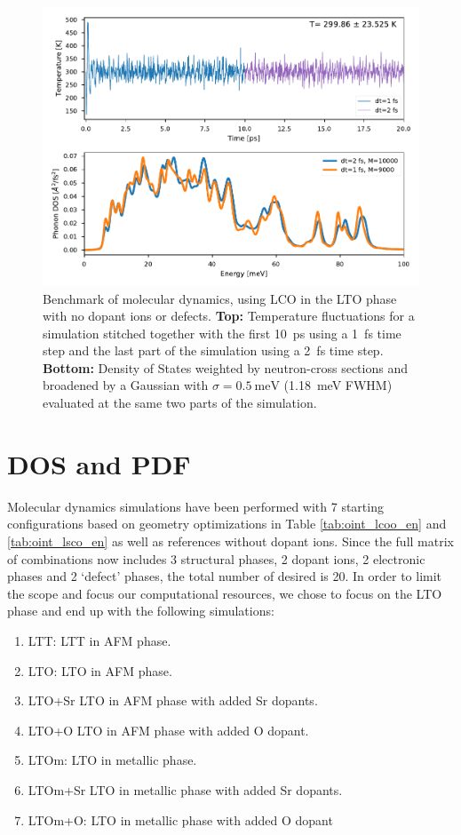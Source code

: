 \begin{figure}
	\centering
	\includegraphics[width=\textwidth]{fig/md/stitch.pdf}
	\caption[stitched md runs]{Benchmark of molecular dynamics, using LCO in the LTO phase with no dopant ions or defects. \textbf{Top:} Temperature fluctuations for a simulation stitched together with the first \SI{10}{\pico\second} using a \SI{1}{\femto\second} time step and the last part of the simulation using a \SI{2}{\femto\second} time step. \textbf{Bottom:} Density of States weighted by neutron-cross sections and broadened by a Gaussian with $\sigma=\SI{0.5}{\milli\eV}$ (\SI{1.18}{\milli\eV} FWHM) evaluated at the same two parts of the simulation.}
	\label{fig:stitch}
\end{figure}

\section{DOS and PDF}
Molecular dynamics simulations have been performed with 7 starting configurations based on geometry optimizations in Table \ref{tab:oint_lcoo_en} and \ref{tab:oint_lsco_en} as well as references without dopant ions. Since the full matrix of combinations now includes 3 structural phases, 2 dopant ions, 2 electronic phases and 2 `defect' phases, the total number of desired is 20. In order to limit the scope and focus our computational resources, we chose to focus on the LTO phase and end up with the following simulations:

\begin{enumerate}
	\item LTT: LTT in AFM phase.
	\item LTO: LTO in AFM phase.
	\item LTO+Sr LTO in AFM phase with added Sr dopants.
	\item LTO+O LTO in AFM phase with added O dopant.
	\item LTOm: LTO in metallic phase.
	\item LTOm+Sr LTO in metallic phase with added Sr dopants.
	\item LTOm+O: LTO in metallic phase with added O dopant
\end{enumerate}

